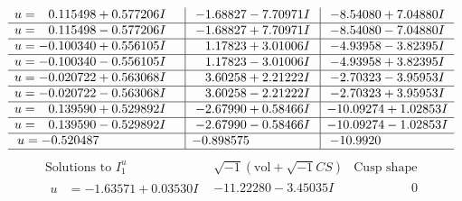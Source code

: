 \documentclass[1p]{elsarticle_modified}
\theoremstyle{definition}
\newcommand{\I}{\sqrt{-1}}
\begin{document}
$$\begin{array}{c|c|c}
\begin{aligned}
u &= \phantom{-}0.115498 + 0.577206 I\end{aligned}
 & -1.68827 - 7.70971 I & -8.54080 + 7.04880 I \\ \hline\begin{aligned}
u &= \phantom{-}0.115498 - 0.577206 I\end{aligned}
 & -1.68827 + 7.70971 I & -8.54080 - 7.04880 I \\ \hline\begin{aligned}
u &= -0.100340 + 0.556105 I\end{aligned}
 & \phantom{-}1.17823 + 3.01006 I & -4.93958 - 3.82395 I \\ \hline\begin{aligned}
u &= -0.100340 - 0.556105 I\end{aligned}
 & \phantom{-}1.17823 - 3.01006 I & -4.93958 + 3.82395 I \\ \hline\begin{aligned}
u &= -0.020722 + 0.563068 I\end{aligned}
 & \phantom{-}3.60258 + 2.21222 I & -2.70323 - 3.95953 I \\ \hline\begin{aligned}
u &= -0.020722 - 0.563068 I\end{aligned}
 & \phantom{-}3.60258 - 2.21222 I & -2.70323 + 3.95953 I \\ \hline\begin{aligned}
u &= \phantom{-}0.139590 + 0.529892 I\end{aligned}
 & -2.67990 + 0.58466 I & -10.09274 + 1.02853 I \\ \hline\begin{aligned}
u &= \phantom{-}0.139590 - 0.529892 I\end{aligned}
 & -2.67990 - 0.58466 I & -10.09274 - 1.02853 I \\ \hline\begin{aligned}
u &= -0.520487\phantom{ +0.000000I}\end{aligned}
 & -0.898575\phantom{ +0.000000I} & -10.9920\phantom{ +0.000000I}\\
 \hline 
 \end{array}$$\newpage$$\begin{array}{c|c|c}  
\text{Solutions to }I^u_{1}& \I (\text{vol} + \sqrt{-1}CS) & \text{Cusp shape}\\
 \hline 
\begin{aligned}
u &= -1.63571 + 0.03530 I\end{aligned}
 & -11.22280 - 3.45035 I & \phantom{-0.000000 } 0 \\ \hline\begin{aligned}

\end{aligned}
\end{array}$$
\end{document}

